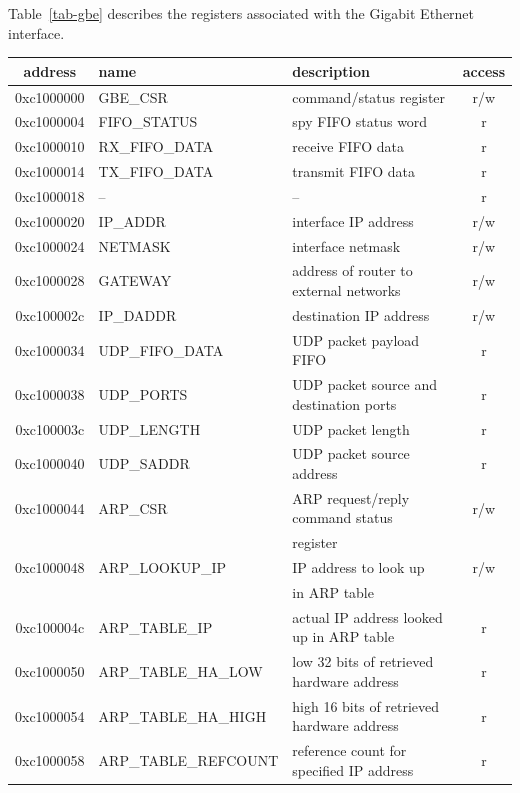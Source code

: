 \documentclass[11pt]{article}
\begin{document}
Table~\ref{tab-gbe} describes the registers associated with the Gigabit Ethernet interface.
\begin{table}
\begin{center}
\small
\begin{tabular}{|c|l|l|c|} \hline
address & name & description & access \\ \hline \hline
0xc1000000 & GBE\_CSR & command/status register & r/w \\ \hline
0xc1000004 & FIFO\_STATUS & spy FIFO status word & r \\ \hline
0xc1000010 & RX\_FIFO\_DATA & receive FIFO data & r \\ \hline
0xc1000014 & TX\_FIFO\_DATA & transmit FIFO data & r \\ \hline
0xc1000018 & -- & -- & r \\ \hline
0xc1000020 & IP\_ADDR & interface IP address & r/w \\ \hline
0xc1000024 & NETMASK & interface netmask & r/w \\ \hline
0xc1000028 & GATEWAY & address of router to external networks & r/w \\ \hline
0xc100002c & IP\_DADDR & destination IP address & r/w \\ \hline
0xc1000034 & UDP\_FIFO\_DATA & UDP packet payload FIFO & r \\ \hline
0xc1000038 & UDP\_PORTS & UDP packet source and destination ports & r \\ \hline
0xc100003c & UDP\_LENGTH & UDP packet length & r \\ \hline
0xc1000040 & UDP\_SADDR & UDP packet source address & r \\ \hline
0xc1000044 & ARP\_CSR & ARP request/reply command status & r/w \\
           &          & register & \\ \hline
0xc1000048 & ARP\_LOOKUP\_IP & IP address to look up & r/w \\
           &                 & in ARP table & \\ \hline
0xc100004c & ARP\_TABLE\_IP & actual IP address looked up in ARP table & r \\ \hline
0xc1000050 & ARP\_TABLE\_HA\_LOW & low 32 bits of retrieved hardware address  & r \\ \hline
0xc1000054 & ARP\_TABLE\_HA\_HIGH & high 16 bits of retrieved hardware address & r \\ \hline
0xc1000058 & ARP\_TABLE\_REFCOUNT & reference count for specified IP address & r \\ 

\end{tabular}
\end{center}
\end{table}
\end{document}
